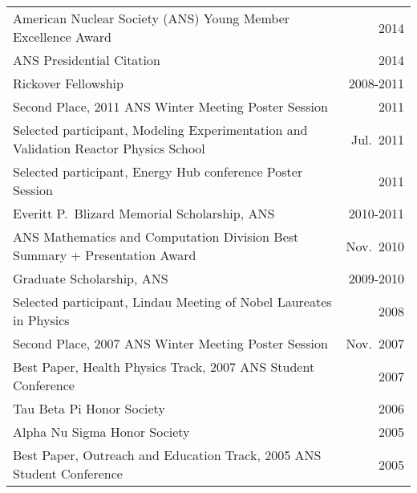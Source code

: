 \begin{tabular}{ @{} l @{\hspace{6ex}} r }
American Nuclear Society (ANS) Young Member Excellence Award & 2014 \\
ANS Presidential Citation & 2014 \\
Rickover Fellowship 	& 2008-2011 \\
Second Place, 2011 ANS Winter Meeting Poster Session	&2011\\
Selected participant, Modeling Experimentation and Validation Reactor Physics School	& Jul.\ 2011\\
Selected participant, Energy Hub conference Poster Session	&2011\\
Everitt P.\ Blizard Memorial Scholarship, ANS	&2010-2011\\
ANS Mathematics and Computation Division Best Summary + Presentation Award  &Nov.\ 2010\\
Graduate Scholarship, ANS 	&2009-2010\\
Selected participant, Lindau Meeting of Nobel Laureates in Physics &	2008\\
Second Place, 2007 ANS Winter Meeting Poster Session	&Nov.\ 2007\\
Best Paper, Health Physics Track, 2007 ANS Student Conference 	&2007\\
Tau Beta Pi Honor Society	&2006\\
Alpha Nu Sigma Honor Society 	&2005 \\
Best Paper, Outreach and Education Track, 2005 ANS Student Conference	&2005
\end{tabular}
